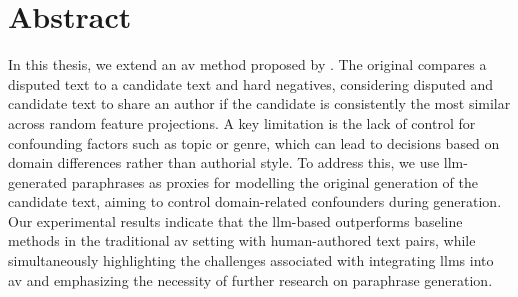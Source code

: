 \chapter*{Abstract}

In this thesis, we extend an \acl{av} method proposed by \citet{koppel_determining_2014}. 
The original \impAppr{} compares a disputed text to a candidate text and hard negatives, considering disputed and candidate text to share an author if the candidate is consistently the most similar across random feature projections. 
A key limitation is the lack of control for confounding factors such as topic or genre, which can lead to decisions based on domain differences rather than authorial style. 
To address this, we use \acs{llm}-generated paraphrases as proxies for modelling the original generation of the candidate text, aiming to control domain-related confounders during \imp{} generation. 
Our experimental results indicate that the \acs{llm}-based \impAppr{} outperforms baseline methods in the traditional \acl{av} setting with human-authored text pairs, while simultaneously highlighting the challenges associated with integrating \acsp{llm} into \acl{av} and emphasizing the necessity of further research on paraphrase generation.
